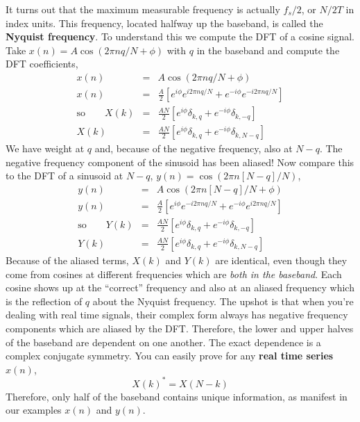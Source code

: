 \documentclass[twocolumn]{article}
\begin{document}
It turns out that the maximum measurable frequency is actually $f_s/2$, or $N/2T$ in index units. This frequency, located halfway up the baseband, is called the \textbf{Nyquist frequency}. To understand this we compute the DFT of a cosine signal. Take $x(n)=A\cos (2\pi nq/N+\phi)$ with $q$ in the baseband and compute the DFT coefficients,
\begin{eqnarray*}
x(n) & = & A\cos\left(2\pi nq/N+\phi \right)\\
x(n) & = & \frac{A}{2}\left[e^{i\phi}e^{i2\pi nq/N}+e^{-i\phi}e^{-i2\pi nq/N}\right]\\
\text{so}\qquad X(k) & = & \frac{AN}{2}\left[e^{i\phi}\delta_{k,q}+e^{-i\phi}\delta_{k,-q}\right]\\
X(k) & = & \frac{AN}{2}\left[e^{i\phi}\delta_{k,q}+e^{-i\phi}\delta_{k,N-q}\right]\end{eqnarray*}
We have weight at $q$ and, because of the negative frequency, also at $N-q$. The negative frequency component of the sinusoid has been aliased! Now compare this to the DFT of a sinusoid at $N-q$, $y(n)=\cos(2\pi n[N-q]/N)$,
\begin{eqnarray*}
y(n) & = & A\cos\left(2\pi n[N-q]/N+\phi\right)\\
y(n) & = & \frac{A}{2}\left[e^{i\phi}e^{-i2\pi nq/N}+e^{-i\phi}e^{i2\pi nq/N}\right]\\
\text{so}\qquad Y(k) & = & \frac{AN}{2}\left[e^{i\phi}\delta_{k,q}+e^{-i\phi}\delta_{k,-q}\right]\\
Y(k) & = & \frac{AN}{2}\left[e^{i\phi}\delta_{k,q}+e^{-i\phi}\delta_{k,N-q}\right]
\end{eqnarray*}
Because of the aliased terms, $X(k)$ and $Y(k)$ are identical, even though they come from cosines at different frequencies which are \emph{both in the baseband}. Each cosine shows up at the ``correct'' frequency and also at an aliased frequency which is the reflection of $q$ about the Nyquist frequency. The upshot is that when you're dealing with real time signals, their complex form always has negative frequency components which are aliased by the DFT. Therefore, the lower and upper halves of the baseband are dependent on one another. The exact dependence is a complex conjugate symmetry. You can easily prove for any \textbf{real time series} $x(n)$,
\begin{equation}
X(k)^* = X(N-k) \label{eq:conjugateSymmetry}
\end{equation}
Therefore, only half of the baseband contains unique information, as manifest in our examples $x(n)$ and $y(n)$.
\end{document}
